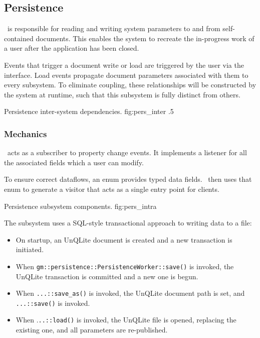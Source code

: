 \subsection{Persistence}
\permod\ is responsible for reading and writing system parameters to and from self-contained documents.
This enables the system to recreate the in-progress work of a user after the application has been closed.

Events that trigger a document write or load are triggered by the user via the interface.
Load events propagate document parameters associated with them to every subsystem.
To eliminate coupling, these relationships will be constructed by the system at runtime, such that this subsystem is fully distinct from others.

{Persistence inter-system dependencies.}
{fig:pers_inter}
{.5}


\subsubsection{Mechanics}
\perftype\ acts as a subscriber to property change events.
It implements a listener for all the associated fields which a user can modify.

To ensure correct dataflows, an enum provides typed data fields.
\permod\ then uses that enum to generate a visitor that acts as a single entry point for clients.


{Persistence subsystem components.}
{fig:pers_intra}
{}

The subsystem uses a SQL-style transactional approach to writing data to a file:
\begin{itemize}
      \item On startup, an UnQLite document is created and a new transaction is initiated.
      \item When \verb|gm::persistence::PersistenceWorker::save()| is invoked, the UnQLite transaction is committed and a new one is begun.
      \item When \verb|...::save_as()| is invoked, the UnQLite document path is set, and \verb|...::save()| is invoked.
      \item When .\verb|..::load()| is invoked, the UnQLite file is opened, replacing the existing one, and all parameters are re-published.
\end{itemize}


